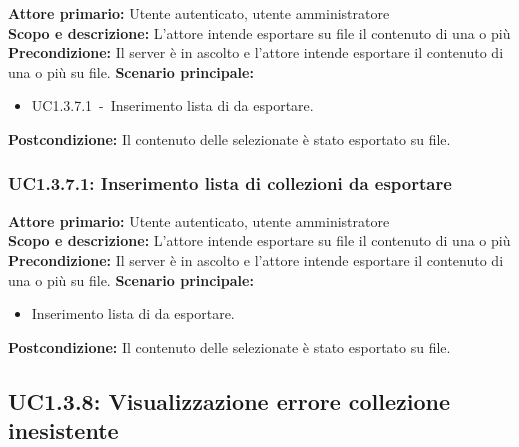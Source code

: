\documentclass{scalatekids-article}
\begin{document}
\textbf{Attore primario:} Utente autenticato, utente amministratore\\
\textbf{Scopo e descrizione:} L'attore intende esportare su file il contenuto di una o più \\
\textbf{Precondizione:} Il server è in ascolto e l'attore intende esportare il contenuto di una o più  su file.
\textbf{Scenario principale:}
\begin{itemize}
\item UC1.3.7.1\ -\ Inserimento lista di  da esportare. %
\end{itemize}
\textbf{Postcondizione:} Il contenuto delle  selezionate è stato esportato su file.

\subsubsection{UC1.3.7.1: Inserimento lista di collezioni da esportare}

\textbf{Attore primario:} Utente autenticato, utente amministratore\\
\textbf{Scopo e descrizione:} L'attore intende esportare su file il contenuto di una o più \\
\textbf{Precondizione:} Il server è in ascolto e l'attore intende esportare il contenuto di una o più  su file.
\textbf{Scenario principale:}
\begin{itemize}
\item Inserimento lista di  da esportare.
\end{itemize}
\textbf{Postcondizione:} Il contenuto delle  selezionate è stato esportato su file.

\subsection{UC1.3.8: Visualizzazione errore collezione inesistente}
\end{document}
